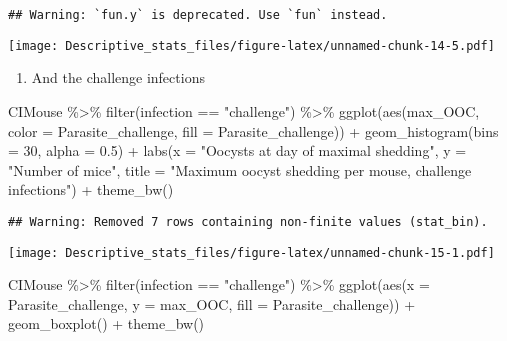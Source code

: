 \documentclass[
]{article}
\newenvironment{Shaded}{\begin{snugshade}}{\end{snugshade}}
\newcommand{\AttributeTok}[1]{\textcolor[rgb]{0.77,0.63,0.00}{#1}}
\newcommand{\DecValTok}[1]{\textcolor[rgb]{0.00,0.00,0.81}{#1}}
\newcommand{\FloatTok}[1]{\textcolor[rgb]{0.00,0.00,0.81}{#1}}
\newcommand{\FunctionTok}[1]{\textcolor[rgb]{0.00,0.00,0.00}{#1}}
\newcommand{\NormalTok}[1]{#1}
\newcommand{\SpecialCharTok}[1]{\textcolor[rgb]{0.00,0.00,0.00}{#1}}
\newcommand{\StringTok}[1]{\textcolor[rgb]{0.31,0.60,0.02}{#1}}
\providecommand{\tightlist}{%
  \setlength{\itemsep}{0pt}\setlength{\parskip}{0pt}}
\begin{document}
\begin{verbatim}
## Warning: `fun.y` is deprecated. Use `fun` instead.
\end{verbatim}

\texttt{[image: Descriptive\_stats\_files/figure-latex/unnamed-chunk-14-5.pdf]}

\begin{enumerate}
\def\labelenumi{\arabic{enumi}.}
\setcounter{enumi}{1}
\tightlist
\item
  And the challenge infections
\end{enumerate}

\begin{Shaded}
\begin{Highlighting}[]
\NormalTok{CIMouse }\SpecialCharTok{\%\textgreater{}\%}
  \FunctionTok{filter}\NormalTok{(infection }\SpecialCharTok{==} \StringTok{"challenge"}\NormalTok{)  }\SpecialCharTok{\%\textgreater{}\%}
  \FunctionTok{ggplot}\NormalTok{(}\FunctionTok{aes}\NormalTok{(max\_OOC, }\AttributeTok{color =}\NormalTok{ Parasite\_challenge, }\AttributeTok{fill =}\NormalTok{ Parasite\_challenge)) }\SpecialCharTok{+}
  \FunctionTok{geom\_histogram}\NormalTok{(}\AttributeTok{bins =} \DecValTok{30}\NormalTok{, }\AttributeTok{alpha =} \FloatTok{0.5}\NormalTok{) }\SpecialCharTok{+}
  \FunctionTok{labs}\NormalTok{(}\AttributeTok{x =} \StringTok{"Oocysts at day of maximal shedding"}\NormalTok{, }\AttributeTok{y =} \StringTok{"Number of mice"}\NormalTok{,}
       \AttributeTok{title =} \StringTok{"Maximum oocyst shedding per mouse, challenge infections"}\NormalTok{) }\SpecialCharTok{+}
    \FunctionTok{theme\_bw}\NormalTok{()}
\end{Highlighting}
\end{Shaded}

\begin{verbatim}
## Warning: Removed 7 rows containing non-finite values (stat_bin).
\end{verbatim}

\texttt{[image: Descriptive\_stats\_files/figure-latex/unnamed-chunk-15-1.pdf]}

\begin{Shaded}
\begin{Highlighting}[]
\NormalTok{CIMouse  }\SpecialCharTok{\%\textgreater{}\%}
    \FunctionTok{filter}\NormalTok{(infection }\SpecialCharTok{==} \StringTok{"challenge"}\NormalTok{)  }\SpecialCharTok{\%\textgreater{}\%}
  \FunctionTok{ggplot}\NormalTok{(}\FunctionTok{aes}\NormalTok{(}\AttributeTok{x =}\NormalTok{ Parasite\_challenge, }\AttributeTok{y =}\NormalTok{ max\_OOC, }\AttributeTok{fill =}\NormalTok{ Parasite\_challenge)) }\SpecialCharTok{+}
  \FunctionTok{geom\_boxplot}\NormalTok{() }\SpecialCharTok{+}
    \FunctionTok{theme\_bw}\NormalTok{()}
\end{Highlighting}
\end{Shaded}
\end{document}
